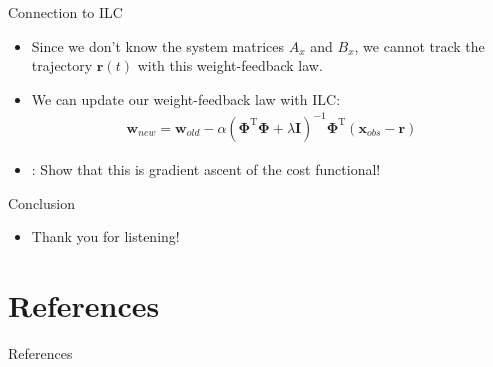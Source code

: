 \documentclass[handout]{beamer}
\newcommand{\todo}{\color{red}{TODO}} %
\newcommand{\basis}{\mathbf{\Phi}} %
\newcommand{\state}{\mathbf{x}} %
\newcommand{\traj}{\mathbf{r}} %
\newcommand{\weights}{\mathbf{w}} %
\begin{document}
%
\begin{frame}{Connection to ILC}
\begin{itemize}
\item Since we don't know the system matrices $A_x$ and $B_x$, we cannot track the trajectory $\traj(t)$ with this weight-feedback law. \item We can update our weight-feedback law with ILC:
\begin{equation*}
\begin{aligned}
\weights_{new} = \weights_{old} - \alpha(\basis^{\mathrm{T}}\basis + \lambda\mathbf{I})^{-1}\basis^{\mathrm{T}}(\state_{obs} - \traj)
\end{aligned}
\end{equation*}
\item \todo: Show that this is gradient ascent of the cost functional!
\end{itemize}
\end{frame}	
%
\begin{frame}{Conclusion}
\begin{itemize}
\item Thank you for listening!
\end{itemize}
\end{frame}	
%
\section{References}
\begin{frame}[allowframebreaks]{References}
\def\newblock{\hskip .11em plus .33em minus .07em}

\end{frame}
%

%
\end{document}
